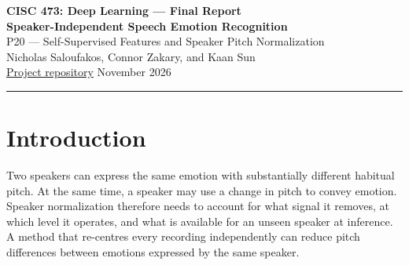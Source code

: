 \documentclass[11pt, letterpaper]{article}
\begin{document}
{\centering
  {\Large\textbf{CISC 473: Deep Learning --- Final Report}}\\[0.6em]
  {\LARGE\bfseries Speaker-Independent Speech Emotion Recognition}\\[0.35em]
  {\large P20 --- Self-Supervised Features and Speaker Pitch Normalization}\\[0.65em]
  Nicholas Saloufakos, Connor Zakary, and Kaan Sun\\[0.35em]
  \href{https://github.com/nsaloufakos/Speech-Emotion-Recognition}{Project repository}
  \quad November 2026\\[0.45em]
  \rule{\linewidth}{0.4pt}\par
}

\begin{abstract}
Speech emotion recognition must generalize to unfamiliar speakers while retaining prosodic cues that help distinguish emotions. We compare three representations on the speech portion of RAVDESS under leave-one-speaker-out evaluation: mel-frequency cepstral coefficients with a bidirectional LSTM, frozen wav2vec~2.0, and frozen HuBERT. We investigate whether reducing between-speaker differences in pitch height improves recognition. Our waveform preprocessing estimates one robust pitch centre per speaker using active, high-strength frames from Praat filtered autocorrelation, then applies a constant pitch-synchronous shift toward 200 Hz. A bounded version limits the shift to four semitones in either direction. On a matched set of 1,429 recordings and three seeds, bounded normalization increased unweighted average recall by 0.65, 0.46, and 0.44 percentage points for the MFCC, wav2vec~2.0, and HuBERT systems, respectively. The corresponding paired speaker-resampling intervals included zero. Full shifts aligned measured pitch centres more closely, while bounded shifts had the highest observed mean recall for each model. In separate original-audio experiments, a validation-selected HuBERT layer probe reached 68.45\% recall on the full speech cohort, and a one-epoch, one-seed backbone fine-tuning run reached 53.06\% on the matched cohort. The results document a reproducible trade-off between pitch alignment and recognition and delimit the evidence for modest gains under unlabeled batch speaker calibration.
\end{abstract}

\section{Introduction}
Two speakers can express the same emotion with substantially different habitual pitch. At the same time, a speaker may use a change in pitch to convey emotion. Speaker normalization therefore needs to account for what signal it removes, at which level it operates, and what is available for an unseen speaker at inference. A method that re-centres every recording independently can reduce pitch differences between emotions expressed by the same speaker.
\end{document}

